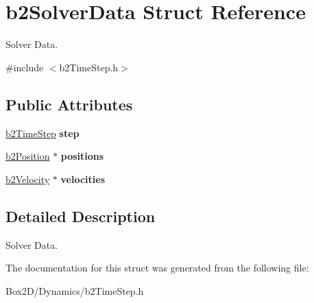 \hypertarget{structb2_solver_data}{}\section{b2\+Solver\+Data Struct Reference}
\label{structb2_solver_data}


Solver Data.  




{\ttfamily \#include $<$b2\+Time\+Step.\+h$>$}

\subsection*{Public Attributes}
\begin{DoxyCompactItemize}
\item 
\mbox{\label{structb2_solver_data_a99998296de1b4f128c396def56392eea}} 
\hyperlink{structb2_time_step}{b2\+Time\+Step} {\bfseries step}
\item 
\mbox{\label{structb2_solver_data_a5eb6ee68b42d96164579a4a0df8be04b}} 
\hyperlink{structb2_position}{b2\+Position} $\ast$ {\bfseries positions}
\item 
\mbox{\label{structb2_solver_data_a1072627a3e962a8bc7088657a512191c}} 
\hyperlink{structb2_velocity}{b2\+Velocity} $\ast$ {\bfseries velocities}
\end{DoxyCompactItemize}


\subsection{Detailed Description}
Solver Data. 

The documentation for this struct was generated from the following file\+:\begin{DoxyCompactItemize}
\item 
Box2\+D/\+Dynamics/b2\+Time\+Step.\+h\end{DoxyCompactItemize}
